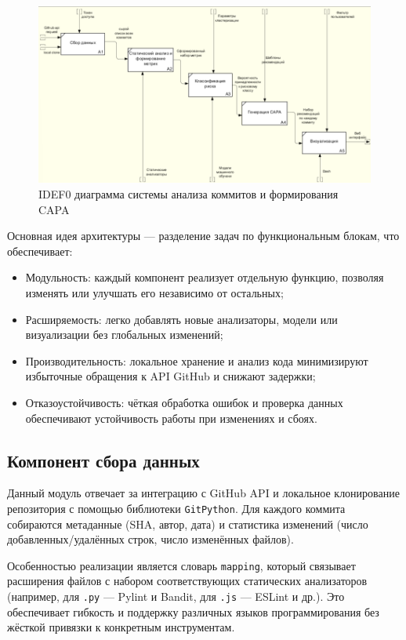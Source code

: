 \begin{figure}[ht]
	\centering
	\includegraphics[width=\textwidth]{my_folder/images/idef0.png}
	\caption{IDEF0 диаграмма системы анализа коммитов и формирования CAPA}
	\label{fig:architecture_diagram}
\end{figure}

Основная идея архитектуры — разделение задач по функциональным блокам, что обеспечивает:

\begin{itemize}
	\item Модульность: каждый компонент реализует отдельную функцию, позволяя изменять или улучшать его независимо от остальных;
	\item Расширяемость: легко добавлять новые анализаторы, модели или визуализации без глобальных изменений;
	\item Производительность: локальное хранение и анализ кода минимизируют избыточные обращения к API GitHub и снижают задержки;
	\item Отказоустойчивость: чёткая обработка ошибок и проверка данных обеспечивают устойчивость работы при изменениях и сбоях.
\end{itemize}

\subsection{Компонент сбора данных}

Данный модуль отвечает за интеграцию с GitHub API и локальное клонирование репозитория с помощью библиотеки \texttt{GitPython}. Для каждого коммита собираются метаданные (SHA, автор, дата) и статистика изменений (число добавленных/удалённых строк, число изменённых файлов).

Особенностью реализации является словарь \texttt{mapping}, который связывает расширения файлов с набором соответствующих статических анализаторов (например, для \texttt{.py} — Pylint и Bandit, для \texttt{.js} — ESLint и др.). Это обеспечивает гибкость и поддержку различных языков программирования без жёсткой привязки к конкретным инструментам.

